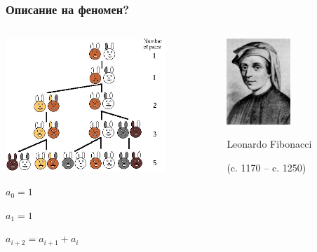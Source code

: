 \documentclass{beamer}
\begin{document}
\begin{frame}[fragile]
\frametitle{Описание на феномен?}
\begin{columns}[t]
  \begin{column}{0.6\textwidth}
    \includegraphics[width=6cm]{images/fib_rabbits}
  
$a_0=1$


$a_1=1$


$a_{i+2} = a_{i+1} + a_i $
  \end{column}
  \begin{column}{0.4\textwidth}
\vspace*{-150px}

   \begin{center}
   \includegraphics[width=2.4cm]{images/Fibonacci}    
     
     Leonardo Fibonacci 

     (c. 1170 – c. 1250)
   \end{center}
  \end{column}
\end{columns}




\end{frame}
\end{document}

